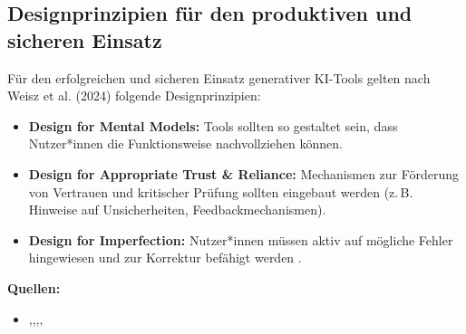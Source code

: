 \subsection{Designprinzipien für den produktiven und sicheren Einsatz}

Für den erfolgreichen und sicheren Einsatz generativer KI-Tools gelten nach
Weisz et al. (2024) folgende Designprinzipien:
\begin{itemize}
    \item \textbf{Design for Mental Models:} Tools sollten so gestaltet sein, dass Nutzer*innen die Funktionsweise nachvollziehen können.
    \item \textbf{Design for Appropriate Trust \& Reliance:} Mechanismen zur Förderung von Vertrauen und kritischer Prüfung sollten eingebaut werden (z.\,B. Hinweise auf Unsicherheiten, Feedbackmechanismen).
    \item \textbf{Design for Imperfection:} Nutzer*innen müssen aktiv auf mögliche Fehler hingewiesen und zur Korrektur befähigt werden \cite{weisz_design_2024}.
\end{itemize}

\textbf{Quellen:}

\begin{itemize}
    \item\cite{geyer_case_2025},\cite{kerr_github_nodate},\cite{weisz_design_2024},\cite{martinovic_impact_2024},\cite{shi_ai-assisted_2023}
\end{itemize}